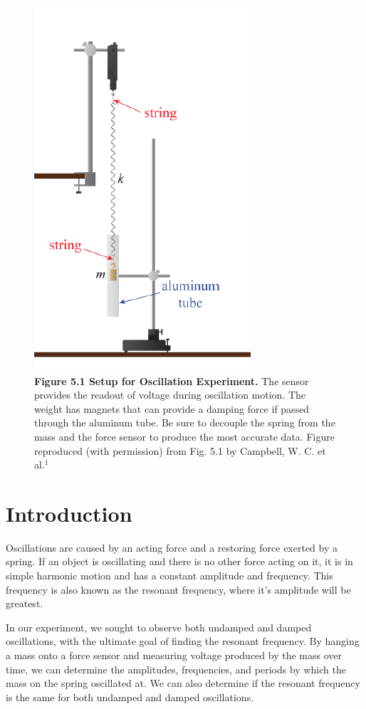 \documentclass[11pt]{report}
\begin{document}
\newpage
\begin{figure}[h!]
    \includegraphics[]{setup.png}
    \captionsetup{labelformat=empty}
    \caption{\textbf{Figure 5.1 Setup for Oscillation Experiment.}  The sensor
    provides the readout of voltage during oscillation motion.  The weight has
    magnets that can provide a damping force if passed through the aluminum
    tube.  Be sure to decouple the spring from the mass and the force sensor to
    produce the most accurate data.  Figure
reproduced (with permission) from Fig. 5.1 by Campbell, W. C. et al.$^1$}
\end{figure}

\newpage
\section*{Introduction}
Oscillations are caused by an acting force and a restoring force exerted by a
spring. If an object is oscillating and there is no other force acting on it, it
is in simple harmonic motion and has a constant amplitude and frequency.  This
frequency is also known as the resonant frequency, where it's amplitude will be
greatest.  

In our experiment, we sought to observe both undamped and damped oscillations,
with the ultimate goal of finding the resonant frequency.  By hanging a mass
onto a force sensor and measuring voltage produced by the mass over time,
we can determine the amplitudes, frequencies, and periods by which the mass on
the spring oscillated at.  We can also determine if the resonant frequency is
the same for both undamped and damped oscillations.   
\end{document}
